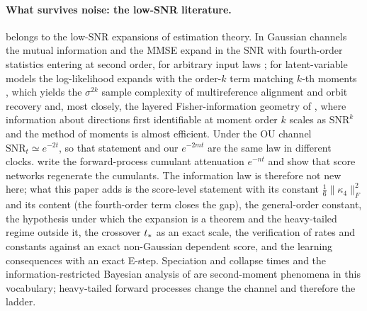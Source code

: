 \paragraph{What survives noise: the low-SNR literature.}
 belongs to the low-SNR expansions of estimation theory. In Gaussian channels the
mutual information and the MMSE expand in the SNR with fourth-order statistics entering at second
order, for arbitrary input laws \citep{prelov2004second,guo2005mutual,dytso2023meta,kong2023information}; for latent-variable
models the log-likelihood expands with the order-$k$ term matching $k$-th moments
\citep{katsevich2023likelihood}, which yields the $\sigma^{2k}$ sample complexity of multireference
alignment and orbit recovery \citep{perry2019sample,bandeira2023estimation} and, most closely, the
layered Fisher-information geometry of \citet{balanov2026gmm}, where information about directions
first identifiable at moment order $k$ scales as $\mathrm{SNR}^k$ and the method of moments is
almost efficient. Under the OU channel $\mathrm{SNR}_t\simeq e^{-2t}$, so that statement and our
$e^{-2mt}$ are the same law in different clocks. \citet{aarts2025cumulants} write the
forward-process cumulant attenuation $e^{-nt}$ and show that score networks regenerate the
cumulants. The information law is therefore not new here; what this paper adds is the score-level
statement with its constant $\tfrac16\|\kappa_4\|_F^2$ and its content (the fourth-order term
closes the gap), the general-order constant, the hypothesis under which the expansion is a theorem
and the heavy-tailed regime outside it, the crossover $t_\ast$ as an exact scale, the verification
of rates and constants against an exact non-Gaussian dependent score, and the learning consequences
with an exact E-step. Speciation and collapse times \citep{biroli2024dynamical,achilli2026speciation}
and the information-restricted Bayesian analysis of \citet{hunt2026exact} are second-moment phenomena
in this vocabulary; heavy-tailed forward processes \citep{pandey2024heavy,tang2026tweedie} change the
channel and therefore the ladder.

